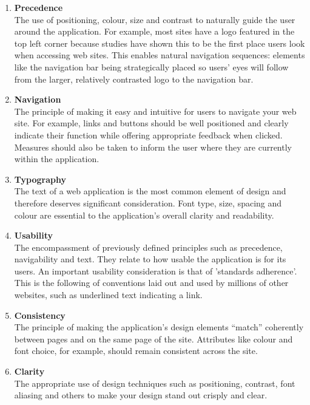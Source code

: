 \documentclass{l3proj}
\begin{document}
\begin{enumerate} 

\item{\textbf{Precedence}} \\
The use of positioning, colour, size and contrast to naturally guide the user around the application. For example, most sites have a logo featured in the top left corner because studies have shown this to be the first place users look when accessing web sites. This enables natural navigation sequences: elements like the navigation bar being strategically placed so users' eyes will follow from the larger, relatively contrasted logo to the navigation bar.

\item{\textbf{Navigation}} \\
The principle of making it easy and intuitive for users to navigate your web site. For example, links and buttons should be well positioned and clearly indicate their function while offering appropriate feedback when clicked. Measures should also be taken to inform the user where they are currently within the application.

\item{\textbf{Typography}} \\
The text of a web application is the most common element of design and therefore deserves significant consideration. Font type, size, spacing and colour are essential to the application's overall clarity and readability.

\item{\textbf{Usability}} \\
The encompassment of previously defined principles such as precedence, navigability and text. They relate to how usable the application is for its users. An important usability consideration is that of 'standards adherence'. This is the following of conventions laid out and used by millions of other websites, such as underlined text indicating a link.

\item{\textbf{Consistency}} \\
The principle of making the application's design elements ``match'' coherently between pages and on the same page of the site. Attributes like colour and font choice, for example, should remain consistent across the site.

\item{\textbf{Clarity}} \\
The appropriate use of design techniques such as positioning, contrast, font aliasing and others to make your design stand out crisply and clear. 
\end{enumerate}
	
\end{document}
